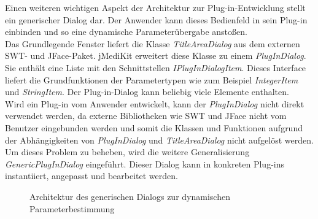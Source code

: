 Einen weiteren wichtigen Aspekt der Architektur zur Plug-in-Entwicklung stellt ein generischer Dialog dar. Der Anwender kann dieses Bedienfeld in sein Plug-in einbinden und so eine dynamische Parameterübergabe anstoßen.\\
Das Grundlegende Fenster liefert die Klasse \textit{TitleAreaDialog} aus dem externen SWT- und JFace-Paket. jMediKit erweitert diese Klasse zu einem \textit{PlugInDialog}. Sie enthält eine Liste mit den Schnittstellen \textit{IPlugInDialogItem}. Dieses  Interface liefert die Grundfunktionen der Parametertypen wie zum Beispiel \textit{IntegerItem} und \textit{StringItem}. Der Plug-in-Dialog kann beliebig viele Elemente enthalten.\\
Wird ein Plug-in vom Anwender entwickelt, kann der \textit{PlugInDialog} nicht direkt verwendet werden, da externe Bibliotheken wie SWT und JFace nicht vom Benutzer eingebunden werden und somit die Klassen und Funktionen aufgrund der Abhängigkeiten von \textit{PlugInDialog} und \textit{TitleAreaDialog} nicht aufgelöst werden.
Um dieses Problem zu beheben, wird die weitere Generalisierung \textit{GenericPlugInDialog} eingeführt. Dieser Dialog kann in konkreten Plug-ins instantiiert, angepasst und bearbeitet werden.

\begin{figure}[htbp]
  \vspace{0.5cm}
  \centering
  \caption{Architektur des generischen Dialogs zur dynamischen Parameterbestimmung}
  \label{plugindialog}
  \vspace{0.5cm}
\end{figure}

